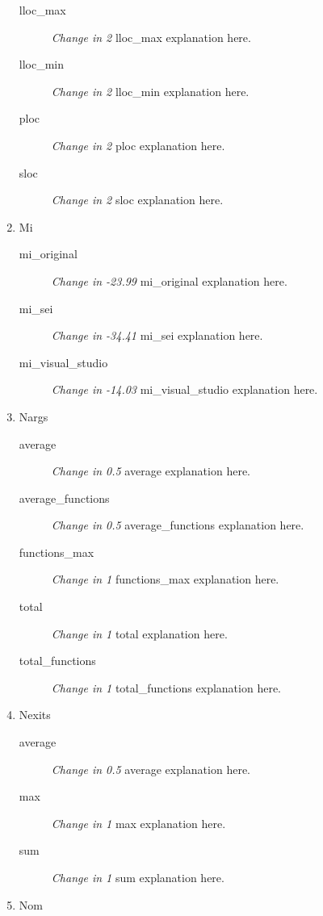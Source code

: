 \begin{enumerate}
\begin{description}
                  \item [lloc\_max] \textit{Change in 2} lloc\_max explanation here.
                  \item [lloc\_min] \textit{Change in 2} lloc\_min explanation here.
                  \item [ploc] \textit{Change in 2} ploc explanation here.
                  \item [sloc] \textit{Change in 2} sloc explanation here.
            \end{description}
      \item Mi
            \begin{description}
                  \item [mi\_original] \textit{Change in -23.99} mi\_original explanation here.
                  \item [mi\_sei] \textit{Change in -34.41} mi\_sei explanation here.
                  \item [mi\_visual\_studio] \textit{Change in -14.03} mi\_visual\_studio explanation here.
            \end{description}
      \item Nargs
            \begin{description}
                  \item [average] \textit{Change in 0.5} average explanation here.
                  \item [average\_functions] \textit{Change in 0.5} average\_functions explanation here.
                  \item [functions\_max] \textit{Change in 1} functions\_max explanation here.
                  \item [total] \textit{Change in 1} total explanation here.
                  \item [total\_functions] \textit{Change in 1} total\_functions explanation here.
            \end{description}
      \item Nexits
            \begin{description}
                  \item [average] \textit{Change in 0.5} average explanation here.
                  \item [max] \textit{Change in 1} max explanation here.
                  \item [sum] \textit{Change in 1} sum explanation here.
            \end{description}
      \item Nom

\end{enumerate}
